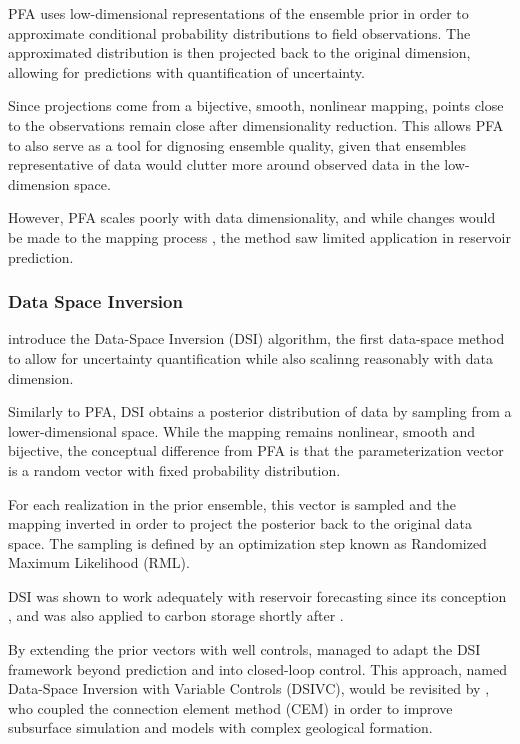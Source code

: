     PFA uses low-dimensional representations of the ensemble prior in order to 
    approximate conditional probability distributions to field observations.
    The approximated distribution is then projected back to the original dimension, 
    allowing for predictions with quantification of uncertainty.
    
    Since projections come from a bijective, smooth, nonlinear mapping, 
    points close to the observations remain close after dimensionality reduction.
    This allows PFA to also serve as a tool for dignosing ensemble quality, 
    given that ensembles representative of data would clutter 
    more around observed data in the low-dimension space.   

    However, PFA scales poorly with data dimensionality,
    and while changes would be made to the mapping process
    \cite{Satija:2015, Satija:2017},
    the method saw limited application in reservoir prediction.

\subsubsection{Data Space Inversion}
     introduce the Data-Space Inversion (DSI) algorithm, 
    the first data-space method to allow for uncertainty quantification 
    while also scalinng reasonably with data dimension. 

    Similarly to PFA, DSI obtains a posterior distribution of data by sampling from a lower-dimensional space.
    While the mapping remains nonlinear, smooth and bijective, 
    the conceptual difference from PFA is that the parameterization vector 
    is a random vector with fixed probability distribution.

    For each realization in the prior ensemble, 
    this vector is sampled and the mapping inverted in order to 
    project the posterior back to the original data space.
    The sampling is defined by an optimization step known as Randomized Maximum Likelihood (RML).

    DSI was shown to work adequately with reservoir forecasting since its conception
    \cite{Sun:2017:A, Sun:2017:B},
    and was also applied to carbon storage shortly after
    \cite{Sun:2019}.
    
    By extending the prior vectors with well controls, 
     managed to adapt the DSI framework beyond prediction and into closed-loop control.
    This approach, named Data-Space Inversion with Variable Controls (DSIVC),
    would be revisited by
    ,
    who coupled the connection element method (CEM) 
    in order to improve subsurface simulation and models with complex geological formation. 

